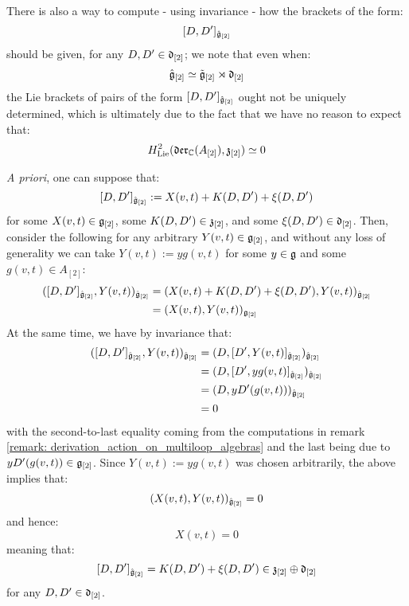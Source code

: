             \begin{remark} \label{remark: dual_of_toroidal_centres_contains_derivations}
                There is also a way to compute - using invariance - how the brackets of the form:
                    $$[D, D']_{\hat{\mathfrak{g}}_{[2]}}$$
                should be given, for any $D, D' \in \mathfrak{d}_{[2]}$; we note that even when:
                    $$\hat{\mathfrak{g}}_{[2]} \simeq \tilde{\mathfrak{g}}_{[2]} \rtimes \mathfrak{d}_{[2]}$$
                the Lie brackets of pairs of the form $[D, D']_{\hat{\mathfrak{g}}_{[2]}}$ ought not be uniquely determined, which is ultimately due to the fact that we have no reason to expect that:
                    $$H^2_{\mathrm{Lie}}(\mathfrak{der}_{\mathbb{C}}(A_{[2]}), \mathfrak{z}_{[2]}) \simeq 0$$
                    
                \textit{A priori}, one can suppose that:
                    $$[D, D']_{\hat{\mathfrak{g}}_{[2]}} := X(v, t) + K(D, D') + \xi(D, D')$$
                for some $X(v, t) \in \mathfrak{g}_{[2]}$, some $K(D, D') \in \mathfrak{z}_{[2]}$, and some $\xi(D, D') \in \mathfrak{d}_{[2]}$. Then, consider the following for any arbitrary $Y(v, t) \in \mathfrak{g}_{[2]}$, and without any loss of generality we can take $Y(v, t) := y g(v, t)$ for some $y \in \mathfrak{g}$ and some $g(v, t) \in A_{[2]}$:
                    $$
                        \begin{aligned}
                            ( [D, D']_{\hat{\mathfrak{g}}_{[2]}}, Y(v, t) )_{\hat{\mathfrak{g}}_{[2]}} & = ( X(v, t) + K(D, D') + \xi(D, D'), Y(v, t) )_{\hat{\mathfrak{g}}_{[2]}}
                            \\
                            & = (X(v, t), Y(v, t))_{\mathfrak{g}_{[2]}}
                        \end{aligned}
                    $$
                At the same time, we have by invariance that:
                    $$
                        \begin{aligned}
                            ( [D, D']_{\hat{\mathfrak{g}}_{[2]}}, Y(v, t) )_{\hat{\mathfrak{g}}_{[2]}} & = ( D, [D', Y(v, t)]_{\hat{\mathfrak{g}}_{[2]}} )_{\hat{\mathfrak{g}}_{[2]}}
                            \\
                            & = ( D, [D', y g(v, t)]_{\hat{\mathfrak{g}}_{[2]}} )_{\hat{\mathfrak{g}}_{[2]}}
                            \\
                            & = ( D, y D'(g(v, t)) )_{\hat{\mathfrak{g}}_{[2]}}
                            \\
                            & = 0
                        \end{aligned}
                    $$
                with the second-to-last equality coming from the computations in remark \ref{remark: derivation_action_on_multiloop_algebras} and the last being due to $y D'(g(v, t)) \in \mathfrak{g}_{[2]}$. Since $Y(v, t) := y g(v, t)$ was chosen arbitrarily, the above implies that:
                    $$(X(v, t), Y(v, t))_{\hat{\mathfrak{g}}_{[2]}} = 0$$
                and hence:
                    $$X(v, t) = 0$$
                meaning that:
                    $$[D, D']_{\hat{\mathfrak{g}}_{[2]}} = K(D, D') + \xi(D, D') \in \mathfrak{z}_{[2]} \oplus \mathfrak{d}_{[2]}$$
                for any $D, D' \in \mathfrak{d}_{[2]}$. 
                

\end{remark}
